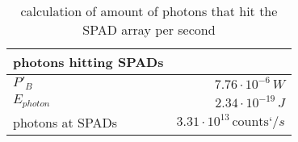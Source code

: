 \begin{table}[H]
\centering
\caption{calculation of amount of photons that hit the SPAD array per second}
\label{tab:photons_hitting_SPADs}
\begin{tabular}{|l|r|}\hline
    \textbf{photons hitting SPADs} & \\
    \hline 
    $P'_B$ & $7.76\cdot10^{-6}\,W$ \\
    $E_{photon}$ & $2.34\cdot10^{-19}\,J$ \\
    photons at SPADs & $3.31\cdot10^{13}\,\text{counts`}/s$ \\
    \hline 
\end{tabular}
\end{table}
